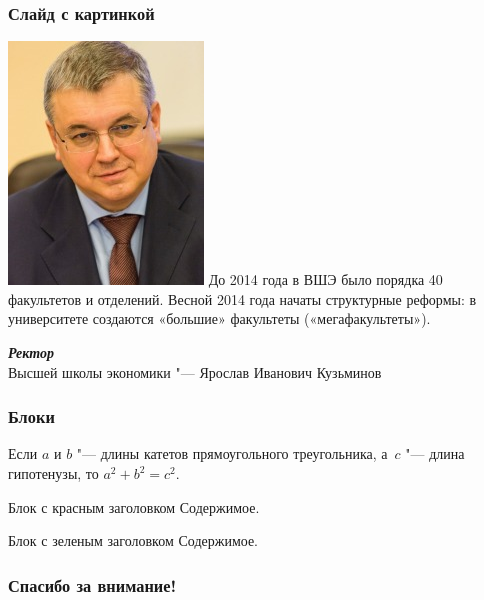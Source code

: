 \documentclass{beamer}
\begin{document}
\begin{frame}
\frametitle{Слайд с картинкой}
	\begin{multicols}{2}
		\includegraphics[width=\columnwidth]{kouzminov.png}
		\columnbreak
		До 2014 года в ВШЭ было порядка 40 факультетов и отделений. Весной 2014 года начаты структурные реформы: в университете создаются «большие» факультеты («мегафакультеты»).
		\medskip 

		\textbf{\textit{Ректор}} \\ Высшей школы экономики "--- \alert{Ярослав Иванович Кузьминов}
	\end{multicols}
\end{frame}

\begin{frame}
\frametitle{Блоки}
	\begin{theorem}[Пифагора]
		Если $a$ и $b$ "--- длины катетов прямоугольного треугольника, а~$c$ "--- длина гипотенузы, то $a^2+b^2=c^2$.
	\end{theorem}

	\begin{alertblock}{Блок с красным заголовком}
		Содержимое.
	\end{alertblock}

	\begin{exampleblock}{Блок с зеленым заголовком}
		Содержимое.
	\end{exampleblock}
\end{frame}

\begin{frame}[c]
\begin{center}
\frametitle{\LARGE Спасибо за внимание!}

{\LARGE \inserttitle}

\bigskip

{\insertauthor}

\bigskip\bigskip

{\insertinstitute}

\bigskip\bigskip

{\large \insertdate}
\end{center}
\end{frame}
\end{document}
